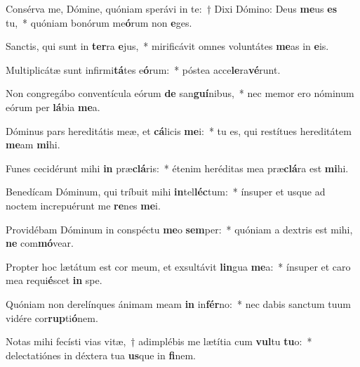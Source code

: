 \item Consérva me, Dómine, quóniam sperávi in te:~† Dixi Dómino: Deus \textbf{me}us \textbf{es} tu,~* quóniam bonórum me\textbf{ó}rum non \textbf{e}ges.
\item Sanctis, qui sunt in \textbf{ter}ra \textbf{e}jus,~* mirificávit omnes voluntátes \textbf{me}as in \textbf{e}is.
\item Multiplicátæ sunt infirmi\textbf{tá}tes e\textbf{ó}rum:~* póstea acce\textbf{le}ra\textbf{vé}runt.
\item Non congregábo conventícula eórum \textbf{de} san\textbf{guí}nibus,~* nec memor ero nóminum eórum per \textbf{lá}bia \textbf{me}a.
\item Dóminus pars hereditátis meæ, et \textbf{cá}licis \textbf{me}i:~* tu es, qui restítues hereditátem \textbf{me}am \textbf{mi}hi.
\item Funes cecidérunt mihi \textbf{in} præ\textbf{clá}ris:~* étenim heréditas mea præ\textbf{clá}ra est \textbf{mi}hi.
\item Benedícam Dóminum, qui tríbuit mihi \textbf{in}tel\textbf{léc}tum:~* ínsuper et usque ad noctem increpuérunt me \textbf{re}nes \textbf{me}i.
\item Providébam Dóminum in conspéctu \textbf{me}o \textbf{sem}per:~* quóniam a dextris est mihi, \textbf{ne} com\textbf{mó}vear.
\item Propter hoc lætátum est cor meum, et exsultávit \textbf{lin}gua \textbf{me}a:~* ínsuper et caro mea requi\textbf{é}scet \textbf{in} spe.
\item Quóniam non derelínques ánimam meam \textbf{in} in\textbf{fér}no:~* nec dabis sanctum tuum vidére cor\textbf{rup}ti\textbf{ó}nem.
\item Notas mihi fecísti vias vitæ,~† adimplébis me lætítia cum \textbf{vul}tu \textbf{tu}o:~* delectatiónes in déxtera tua \textbf{us}que in \textbf{fi}nem.
